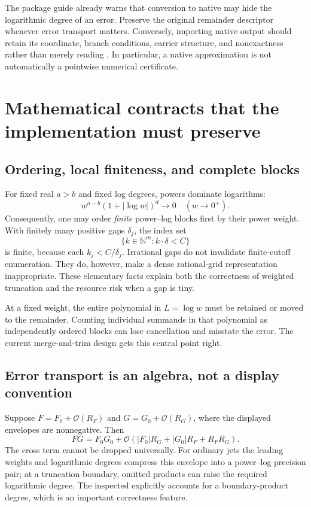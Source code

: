 \documentclass[11pt,a4paper]{article}
\newcommand{\code}[1]{\texttt{\detokenize{#1}}}
\newcommand{\OO}{\mathcal O}
\newcommand{\N}{\mathbb N}
\begin{document}
The package guide already warns that conversion to native \code{SeriesData} may hide the logarithmic degree of an error. Preserve the original remainder descriptor whenever error transport matters. Conversely, importing native output should retain its coordinate, branch conditions, carrier structure, and nonexactness rather than merely reading \code{Normal}. In particular, a native \code{Asymptotic} approximation is not automatically a pointwise numerical certificate.\cite{repo-guide,wl-seriesdata,wl-asymptotic}

\section{Mathematical contracts that the implementation must preserve}\label{sec:contracts}

\subsection{Ordering, local finiteness, and complete blocks}
For fixed real \(a>b\) and fixed log degrees, powers dominate logarithms:
\[
 w^{a-b}(1+|\log w|)^d\longrightarrow0\quad(w\to0^+).
\]
Consequently, one may order \emph{finite} power--log blocks first by their power weight. With finitely many positive gaps \(\delta_j\), the index set
\[
 \{k\in\N^m:k\cdot\delta<C\}
\]
is finite, because each \(k_j<C/\delta_j\). Irrational gaps do not invalidate finite-cutoff enumeration. They do, however, make a dense rational-grid representation inappropriate. These elementary facts explain both the correctness of weighted truncation and the resource risk when a gap is tiny.

At a fixed weight, the entire polynomial in \(L=\log w\) must be retained or moved to the remainder. Counting individual summands in that polynomial as independently ordered blocks can lose cancellation and misstate the error. The current merge-and-trim design gets this central point right.\cite{repo-main}

\subsection{Error transport is an algebra, not a display convention}
Suppose \(F=F_0+\OO(R_F)\) and \(G=G_0+\OO(R_G)\), where the displayed envelopes are nonnegative. Then
\[
 FG=F_0G_0+
 \OO\!\left(|F_0|R_G+|G_0|R_F+R_FR_G\right).
\]
The cross term cannot be dropped universally. For ordinary jets the leading weights and logarithmic degrees compress this envelope into a power--log precision pair; at a truncation boundary, omitted products can raise the required logarithmic degree. The inspected \code{pMul} explicitly accounts for a boundary-product degree, which is an important correctness feature.\cite{repo-main,repo-envelope}
\end{document}
